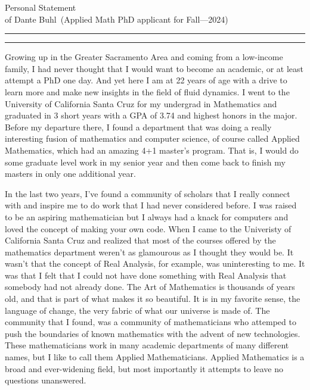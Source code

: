 \documentclass{article}
\newcommand{\soptitle}{Personal Statement}
\newcommand{\yourname}{Dante Buhl}
\begin{document}
\begin{center}\LARGE\soptitle\\
\large of \yourname\ (Applied Math PhD applicant for Fall---2024)
\end{center}

\hrule
\vspace{1pt}
\hrule height 1pt

\bigskip

\large

Growing up in the Greater Sacramento Area and coming from a low-income family, I had never thought that I would want to become an academic, or at least attempt a PhD one day. And yet here I am at 22 years of age with a drive to learn more and make new insights in the field of fluid dynamics. I went to the University of California Santa Cruz for my undergrad in Mathematics and graduated in 3 short years with a GPA of 3.74 and highest honors in the major. Before my departure there, I found a department that was doing a really interesting fusion of mathematics and computer science, of course called Applied Mathematics, which had an amazing 4+1 master's program. That is, I would do some graduate level work in my senior year and then come back to finish my masters in only one additional year. 

In the last two years, I've found a community of scholars that I really connect with and inspire me to do work that I had never considered before. I was raised to be an aspiring mathematician but I always had a knack for computers and loved the concept of making your own code. When I came to the Univeristy of California Santa Cruz and realized that most of the courses offered by the mathematics department weren't as glamourous as I thought they would be. It wasn't that the concept of Real Analysis, for example, was uninteresting to me. It was that I felt that I could not have done something with Real Analysis that somebody had not already done. The Art of Mathematics is thousands of years old, and that is part of what makes it so beautiful. It is in my favorite sense, the language of change, the very fabric of what our universe is made of. The community that I found, was a community of mathematicians who attemped to push the boundaries of known mathematics with the advent of new technologies. These mathematicians work in many academic departments of many different names, but I like to call them Applied Mathematicians. Applied Mathematics is a broad and ever-widening field, but most importantly it attempts to leave no questions unanswered.
\end{document}
